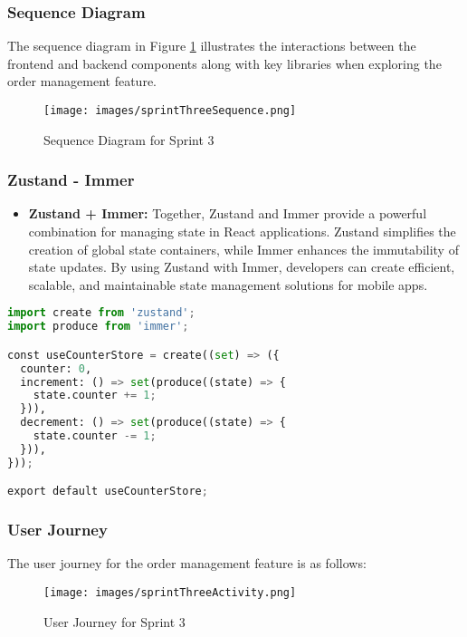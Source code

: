 \subsubsection{Sequence Diagram}

The sequence diagram in Figure \ref{fig:sequence_sprint3} illustrates the interactions between the frontend and backend components along with key libraries when exploring the order management feature.

\begin{figure}[H]
    \centering
    \texttt{[image: images/sprintThreeSequence.png]}
    \caption{Sequence Diagram for Sprint 3}
    \label{fig:sequence_sprint3}
\end{figure}

\subsubsection{Zustand - Immer}

\begin{itemize}
    \item \textbf{Zustand + Immer:} Together, Zustand and Immer provide a powerful combination for managing state in React applications. Zustand simplifies the creation of global state containers, while Immer enhances the immutability of state updates. By using Zustand with Immer, developers can create efficient, scalable, and maintainable state management solutions for mobile apps.
\end{itemize}

\begin{lstlisting}[language=Python, caption=Zustand + Immer Example, frame=single, framerule=0.5pt]
import create from 'zustand';
import produce from 'immer';

const useCounterStore = create((set) => ({
  counter: 0,
  increment: () => set(produce((state) => {
    state.counter += 1;
  })),
  decrement: () => set(produce((state) => {
    state.counter -= 1;
  })),
}));

export default useCounterStore;
\end{lstlisting}

\subsubsection{User Journey}

The user journey for the order management feature is as follows:

\begin{figure}[H]
    \centering
    \texttt{[image: images/sprintThreeActivity.png]}
    \caption{User Journey for Sprint 3}
    \label{fig:activity_sprint3}
\end{figure}

